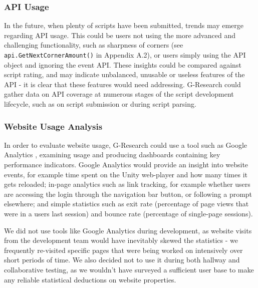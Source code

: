 \subsubsection{API Usage}

In the future, when plenty of scripts have been submitted, trends may emerge regarding API usage. This could be users not using the more advanced and challenging functionality, such as sharpness of corners (see {\tt api.GetNextCornerAmount()} in Appendix A.2), or users simply using the API object and ignoring the event API. These insights could be compared against script rating, and may indicate unbalanced, unusable or useless features of the API - it is clear that these features would need addressing. G-Research could gather data on API coverage at numerous stages of the script development lifecycle, such as on script submission or during script parsing.

\subsubsection{Website Usage Analysis}

In order to evaluate website usage, G-Research could use a tool such as Google Analytics \cite{googleanalytics}, examining usage and producing dashboards containing key performance indicators. Google Analytics would provide an insight into website events, for example time spent on the Unity web-player and how many times it gets reloaded; in-page analytics such as link tracking, for example whether users are accessing the login through the navigation bar button, or following a prompt elsewhere; and simple statistics such as exit rate (percentage of page views that were in a users last session) and bounce rate (percentage of single-page sessions).

We did not use tools like Google Analytics during development, as website visits from the development team would have inevitably skewed the statistics - we frequently re-visited specific pages that were being worked on intensively over short periods of time. We also decided not to use it during both hallway and collaborative testing, as we wouldn't have surveyed a sufficient user base to make any reliable statistical deductions on website properties. 


